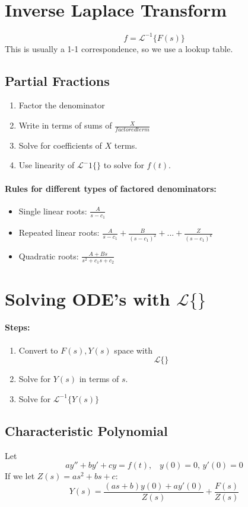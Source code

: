 \documentclass[a4paper,12pt]{report}
\begin{document}
\section{Inverse Laplace Transform}
$$f = \mathcal{L}^{-1}\{ F(s) \}$$
This is usually a 1-1 correspondence, so we use a lookup table. 

\subsection{Partial Fractions}
\begin{enumerate}
\item Factor the denominator
\item Write in terms of sums of $\frac{X}{factored term}$
\item Solve for coefficients of $X$ terms.
\item Use linearity of $\mathcal{L}^-1\{  \}$ to solve for $f(t)$.
\end{enumerate}

\paragraph{Rules for different types of factored denominators: } 
\begin{itemize}
\item Single linear roots: $\frac{A}{s - c_1}$
\item Repeated linear roots: $\frac{A}{s - c_1} + \frac{B}{(s-c_1)^2} + ... + \frac{Z}{(s-c_1)^k}$
\item Quadratic roots: $\frac{A + Bs}{s^2 + c_1s + c_2}$
\end{itemize}

\section{Solving ODE's with $\mathcal{L} \{\}$}
\paragraph{Steps: } 
\begin{enumerate}
\item Convert to $F(s), Y(s)$ space with $$\mathcal{L} \{\}$$
\item Solve for $Y(s)$ in terms of $s$.
\item Solve for $\mathcal{L}^{-1} \{Y(s)\}$
\end{enumerate}

\subsection{Characteristic Polynomial}
Let $$ay'' + by' + cy = f(t),\,\,\,\,\, y(0) = 0,\,y'(0) = 0$$
If we let $Z(s) = as^2 + bs + c$:
$$Y(s) = \frac{(as + b)y(0) + ay'(0)}{Z(s)} + \frac{F(s)}{Z(s)}$$
\end{document}

